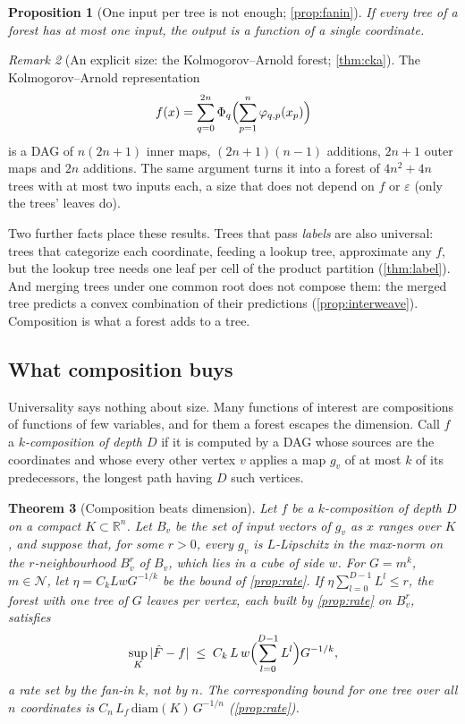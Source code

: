 \documentclass[11pt]{article}
\newtheorem{theorem}{Theorem}
\newtheorem{proposition}[theorem]{Proposition}
\theoremstyle{definition}
\theoremstyle{remark}
\newtheorem{remark}[theorem]{Remark}
\newcommand{\R}{\mathbb{R}}
\newcommand{\N}{\mathcal{N}}
\begin{document}
\begin{proposition}[One input per tree is not enough; \cref{prop:fanin}]\label{prop:fanin-main}
If every tree of a forest has at most one input, the output is a function of a single
coordinate.
\end{proposition}

\begin{remark}[An explicit size: the Kolmogorov--Arnold forest; \cref{thm:cka}]\label{rem:ka-main}
The Kolmogorov--Arnold representation
\begin{equation}\label{eq:ka}
  f(x)=\sum_{q=0}^{2n}\Phi_q\Bigl(\sum_{p=1}^n\varphi_{q,p}(x_p)\Bigr)
\end{equation}
is a DAG of
$n(2n+1)$ inner maps, $(2n+1)(n-1)$ additions, $2n+1$ outer maps and $2n$ additions.  The
same argument turns it into a forest of $4n^2+4n$ trees with at most two inputs each, a
size that does not depend on $f$ or $\varepsilon$ (only the trees' leaves do).
\end{remark}

Two further facts place these results.  Trees that pass \emph{labels} are also universal:
trees that categorize each coordinate, feeding a lookup tree, approximate any $f$, but the
lookup tree needs one leaf per cell of the product partition (\cref{thm:label}).  And
merging trees under one common root does not compose them: the merged tree predicts a
convex combination of their predictions (\cref{prop:interweave}).  Composition is what a
forest adds to a tree.

\subsection{What composition buys}

Universality says nothing about size.  Many functions of interest are compositions of
functions of few variables, and for them a forest escapes the dimension.  Call $f$ a
\emph{$k$-composition of depth $D$} if it is computed by a DAG whose sources are the
coordinates and whose every other vertex $v$ applies a map $g_v$ of at most $k$ of its
predecessors, the longest path having $D$ such vertices.

\begin{theorem}[Composition beats dimension]\label{thm:compose}
Let $f$ be a $k$-composition of depth $D$ on a compact $K\subset\R^n$.  Let $B_v$ be the
set of input vectors of $g_v$ as $x$ ranges over $K$, and suppose that, for some $r>0$,
every $g_v$ is $L$-Lipschitz in the max-norm on the $r$-neighbourhood $B_v^r$ of $B_v$,
which lies in a cube of side $w$.  For $G=m^k$, $m\in\N$, let $\eta=C_kLwG^{-1/k}$ be the
bound of \cref{prop:rate}.  If $\eta\sum_{l=0}^{D-1}L^l\le r$, the forest with one tree of $G$
leaves per vertex, each built by \cref{prop:rate} on $B_v^r$, satisfies
\[
  \sup_K|\hat F-f|\;\le\;C_k\,L\,w\Bigl(\sum_{l=0}^{D-1}L^l\Bigr)G^{-1/k},
\]
a rate set by the fan-in $k$, not by $n$.  The corresponding bound for one tree over all
$n$ coordinates is $C_n\,L_f\,\mathrm{diam}(K)\,G^{-1/n}$ (\cref{prop:rate}).
\end{theorem}
\end{document}
